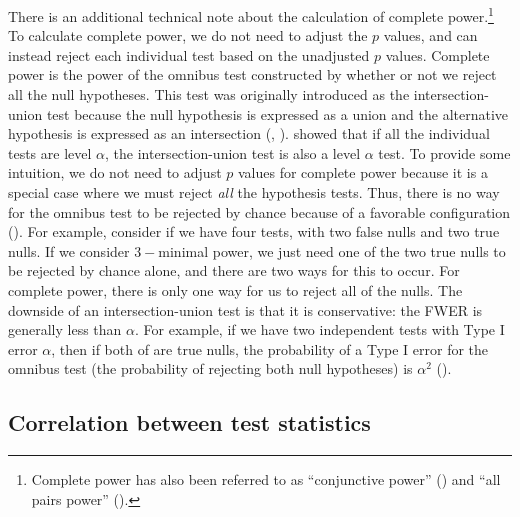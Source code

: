 \documentclass[
]{jss}
\begin{document}
There is an additional technical note about the calculation of complete
power.\footnote{Complete power has also been referred to as
  ``conjunctive power'' (\citet{RN33091}) and ``all pairs power''
  (\citet{RN33097}).} To calculate complete power, we do not need to
adjust the \(p\) values, and can instead reject each individual test
based on the unadjusted \(p\) values. Complete power is the power of the
omnibus test constructed by whether or not we reject all the null
hypotheses. This test was originally introduced as the
intersection-union test because the null hypothesis is expressed as a
union and the alternative hypothesis is expressed as an intersection
(\citet{Berger1982}, \citet{Berger1996}). \citet{Berger1982} showed that
if all the individual tests are level \(\alpha\), the intersection-union
test is also a level \(\alpha\) test. To provide some intuition, we do
not need to adjust \(p\) values for complete power because it is a
special case where we must reject \emph{all} the hypothesis tests. Thus,
there is no way for the omnibus test to be rejected by chance because of
a favorable configuration (\citet{RN23882}). For example, consider if we
have four tests, with two false nulls and two true nulls. If we consider
\(3-\)minimal power, we just need one of the two true nulls to be
rejected by chance alone, and there are two ways for this to occur. For
complete power, there is only one way for us to reject all of the nulls.
The downside of an intersection-union test is that it is conservative:
the FWER is generally less than \(\alpha\). For example, if we have two
independent tests with Type I error \(\alpha\), then if both of are true
nulls, the probability of a Type I error for the omnibus test (the
probability of rejecting both null hypotheses) is \(\alpha^2\)
(\citet{Deng2008}).

\subsection{Correlation between test statistics}
\label{sec:corr}
\end{document}
